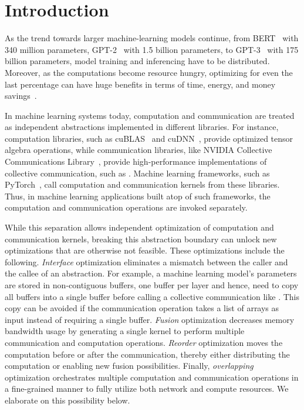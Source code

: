 \section{Introduction}
\label{sec:intro}

As the trend towards larger machine-learning models continue, from BERT~\cite{bert} with 340 million parameters, GPT-2~\cite{gpt-2} with 1.5 billion parameters, to GPT-3~\cite{gpt3} with 175 billion parameters, model training and inferencing have to be distributed. Moreover, as the computations become resource hungry, optimizing for even the last percentage can have huge benefits in terms of time, energy, and money savings~\cite{gpt3cost,strubell2019energy}.

In machine learning systems today, computation and communication are treated as independent abstractions implemented in different libraries. For instance, computation libraries, such as cuBLAS~\cite{cublas} and cuDNN~\cite{cudnn}, provide optimized tensor algebra operations, while communication libraries, like NVIDIA Collective Communications Library~\cite{nccl}, provide high-performance implementations of collective communication, such as \allreduce. Machine learning frameworks, such as PyTorch~\cite{pytorch}, call computation and communication kernels from these libraries. Thus, in machine learning applications built atop of such frameworks, the computation and communication operations are invoked separately.

While this separation allows independent optimization of computation and communication kernels, breaking this abstraction boundary can unlock new optimizations that are otherwise not feasible. These optimizations include the following. \emph{Interface} optimization eliminates a mismatch between the caller and the callee of an abstraction. For example, a machine learning model's parameters are stored in non-contiguous buffers, one buffer per layer and hence, need to copy all buffers into a single buffer before calling a collective communication like \allreduce. This copy can be avoided if the communication operation takes a list of arrays as input instead of requiring a single buffer. 
\emph{Fusion} optimization decreases memory bandwidth usage by generating a single kernel to perform multiple communication and computation operations. 
\emph{Reorder} optimization moves the computation before or after the communication, thereby either distributing the computation or enabling new fusion possibilities. 
Finally, \emph{overlapping} optimization orchestrates multiple computation and communication operations in a fine-grained manner to fully utilize both network and compute resources. We elaborate on this possibility below.  

